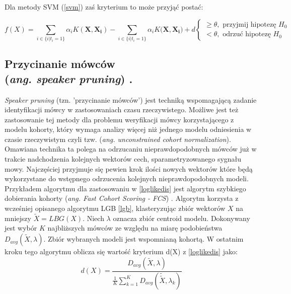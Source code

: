 Dla metody SVM (\ref{svm}) zaś kryterium to może przyjąć postać:

\begin{equation}
  \label{loglikesvm}
  f(X)= \sum_{i\in\{i|t_i = 1\}} \alpha_i K(\bm{X},\bm{X_i}) - \sum_{i\in\{i|t_i = 1\}}\alpha_i K(\bm{X},\bm{X_i)} + d
  \begin{cases}
    \ge \theta, \textrm{ przyjmij hipotezę } H_0 \\
    < \theta, \textrm{ odrzuć hipotezę } H_0
  \end{cases}
\end{equation}

\subsection{Przycinanie mówców\\ (\textit{ang. speaker pruning}) \label{speakerprunning}.}

\textit{Speaker pruning} (tzn. 'przycinanie mówców') jest techniką wspomagającą zadanie identyfikacji mówcy w zastosowaniach czasu rzeczywistego. Możliwe jest też zastosowanie tej metody dla problemu weryfikacji mówcy korzystającego z modelu kohorty, który wymaga analizy więcej niż jednego modelu odniesienia w czasie rzeczywistym czyli tzw. (\textit{ang. unconstrained cohort normalization}). Omawiana technika ta polega na odrzucaniu nieprawdopodobnych mówców już w trakcie nadchodzenia kolejnych wektorów cech, sparametryzowanego sygnału mowy. Najczęściej przyjmuje się pewien krok ilości nowych wektorów które będą wykorzystane do wstępnego odrzucenia kolejnych nieprawdopodobnych modeli. Przykładem algorytmu dla zastosowaniu w \ref{loglikedis} jest algorytm szybkiego dobierania kohorty (\textit{ang. Fast Cohort Scoring - FCS}) \cite{finprunning}. Algorytm korzysta z wcześniej opisanego algorytmu LGB \ref{lgb}, klasteryzując zbiór wektorów $X$ na mniejszy $\tilde{X} = LBG(X)$. Niech $\lambda$ oznacza zbiór centroid modelu. Dokonywany jest wybór $K$ najbliższych mówców ze względu na miarę podobieństwa $D_{avg}(\tilde{X},\lambda)$. Zbiór wybranych modeli jest wspomnianą kohortą. W ostatnim kroku tego algorytmu oblicza się wartość kryterium d(X) z \ref{loglikedis} jako:
\begin{equation}
  d(X) = \frac{D_{avg}(\tilde{X},\lambda)}{\frac{1}{K}\sum_{k=1}^{K}D_{avg}(\tilde{\tilde{X}},\lambda_k)}
\end{equation}
